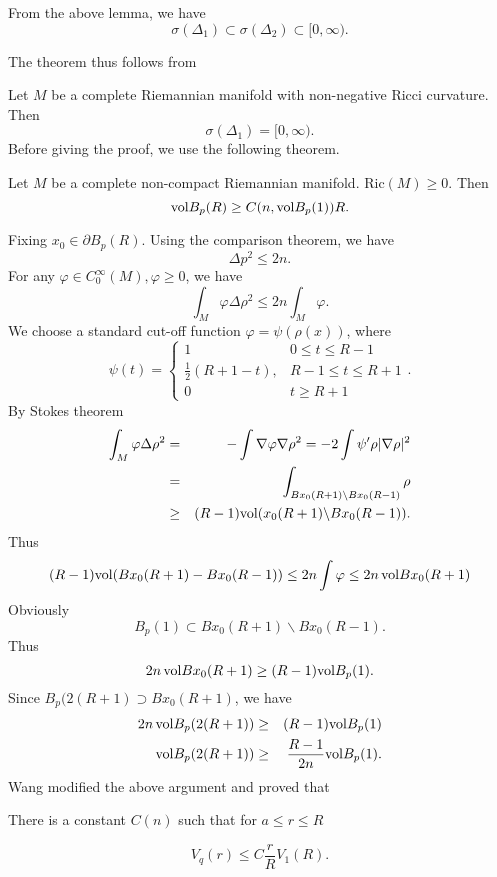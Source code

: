 From the above lemma, we have 
%
\[ \sigma (\Delta _1) \subset \sigma (\Delta _2 ) \subset [ 0, \infty). \]

The theorem thus follows from 

\begin{theorem}[Wang] Let $ M$ be a complete Riemannian manifold with non-negative Ricci curvature. Then
%
\[ \sigma (\Delta_1) = [0, \infty). \]
Before giving the proof, we use the following theorem.
\end{theorem}
\begin{theorem}Let $M$ be a complete non-compact Riemannian manifold. Ric$(M) \geq 0 $. Then 
%
\[ {\rm vol} B_p (R) \geq C (n , {\rm vol} B_p (1) ) R .\]
%
 \end{theorem}
 Fixing $ x_0 \in \partial B_p (R) $. Using the comparison theorem, we have 
%
\[ \Delta p^2 \leq 2 n .\]
For any $ \varphi \in C^\infty _0 (M), \varphi \geq 0 $, we have 
%
\[ \int _M \varphi \Delta \rho^2 \leq  2 n \int_M \varphi.\]
%
We choose a standard cut-off function $ \varphi = \psi ( \rho (x)) $, where
%
\[ \psi (t) = \left\{ \begin{array} {ll} 1 & 0 \leq t \leq R - 1\\
\frac{1}{2} (R+1 - t), & R-1 \leq t \leq R+1 \\
0 & t \geq R + 1 
\end{array} \right. .\]
%
By Stokes theorem
%
\begin{eqnarray*}
\int_M \varphi \Delta \rho^2 & = & - \int \nabla \varphi \nabla \rho^2 = - 2 \int \psi ^\prime \rho |\nabla \rho| ^2 \\
 & = & \int_{Bx_{0} (R + 1) \backslash B x_{0} (R-1) } \rho\\
& \geq & (R - 1) {\rm vol} ( x_0 (R+1) \backslash Bx_0 (R-1)) .
\end{eqnarray*}
%
Thus 
%
\[ (R-1) {\rm vol} (B x_{0} (R+1)- B x_{0} (R-1) ) \leq 2 n \int \varphi \leq 2 n \, {\rm vol} B x_{0} (R+1)\]
%
Obviously
%
\[ B_p (1) \subset B x_{0} (R+1) \backslash B x_{0} (R-1) .\]
%
Thus
%
\[ 2 n\,  {\rm vol} B x_{0} (R+1) \geq (R-1) {\rm vol} B _p (1) .\]
%
Since $ B_p (2 (R+1) \supset B x_{0} (R+1) $, we have 
\begin{eqnarray*}
 2 n \, {\rm vol} B _p(2 (R+1))& \geq & (R-1) {\rm vol} B _p (1) \\
  {\rm vol} B_p (2 ( R+1)) & \geq & \frac{R-1}{2n} {\rm vol} B_p (1). \end{eqnarray*}
Wang modified the above argument and proved that 

\begin{lemma} There is a constant $ C(n) $ such that for $ a \leq r \leq R$ \end{lemma}
%
\begin{equation}
V_q (r) \leq C \frac{r}{R} V_1 (R). \tag{$\star$} 
\end{equation}

